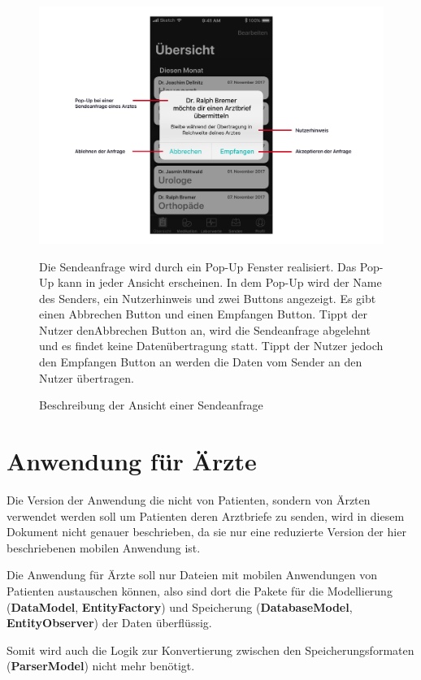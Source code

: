 \documentclass[a4paper]{scrreprt}
\begin{document}
\begin{figure}
\includegraphics[width=1\textwidth]{graphics/UIDescriptions/PopUpDesc}
\caption{Beschreibung der Ansicht einer Sendeanfrage}
\vspace{0.5cm}
Die Sendeanfrage wird durch ein Pop-Up Fenster realisiert. Das Pop-Up kann in jeder Ansicht erscheinen. In dem Pop-Up wird der Name des Senders, ein Nutzerhinweis und zwei Buttons angezeigt. Es gibt einen \dq Abbrechen\dq{} Button und einen \dq Empfangen\dq{} Button. Tippt der Nutzer den\dq Abbrechen\dq{} Button an, wird die Sendeanfrage abgelehnt und es findet keine Datenübertragung statt. Tippt der Nutzer jedoch den \dq Empfangen\dq{} Button an werden die Daten vom Sender an den Nutzer übertragen.
\end{figure}

\chapter{Anwendung für Ärzte}
Die Version der Anwendung die nicht von Patienten, sondern von Ärzten verwendet werden soll um Patienten deren Arztbriefe zu senden, wird in diesem Dokument nicht genauer beschrieben, da sie nur eine reduzierte Version der hier beschriebenen mobilen Anwendung ist. 

Die Anwendung für Ärzte soll nur Dateien mit mobilen Anwendungen von Patienten austauschen können, also
sind dort die Pakete für die Modellierung (\textbf{DataModel}, \textbf{EntityFactory}) und Speicherung (\textbf{DatabaseModel}, \textbf{EntityObserver}) der Daten überflüssig. 

Somit wird auch die Logik zur Konvertierung zwischen den Speicherungsformaten (\textbf{ParserModel}) nicht mehr benötigt. 
\end{document}
